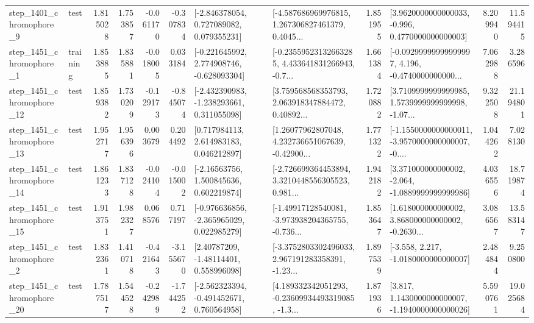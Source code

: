 \begin{tabular}{llrrrrllrlrr}
  step\_1401\_chromophore\_9 &      test &      1.815028 &    1.753857 &     -0.061170 & -0.307834 &    [-2.846378054, 0.727089082, 0.079355231] &  [-4.587686969976815, 1.267306827461379, 0.4045... &       1.851955 &   [3.9620000000000033, -0.996, 0.4770000000000003] &            8.209940 &         11.594415 \\
  step\_1451\_chromophore\_1 &  training &      1.853885 &    1.835881 &     -0.018005 &  0.033184 &   [-0.221645992, 2.774908746, -0.628093304] &  [-0.23559523132663285, 4.433641831266943, -0.7... &       1.661384 &  [-0.09299999999999997, 4.196, -0.4740000000000... &            7.062988 &          3.286596 \\
 step\_1451\_chromophore\_12 &      test &      1.859382 &    1.730209 &     -0.129173 & -0.845074 &   [-2.432390983, -1.238293661, 0.311055098] &  [3.759568568353793, 2.063918347884472, 0.40892... &       1.720882 &  [3.7109999999999985, 1.5739999999999998, -1.07... &            9.322508 &         21.194801 \\
 step\_1451\_chromophore\_13 &      test &      1.952717 &    1.956396 &      0.003679 &  0.204492 &     [0.717984113, 2.614983183, 0.046212897] &  [1.26077962807048, 4.232736651067639, -0.42900... &       1.771322 &  [-1.1550000000000011, -3.9570000000000007, -0.... &            1.044262 &          7.028130 \\
 step\_1451\_chromophore\_14 &      test &      1.861233 &    1.837128 &     -0.024104 & -0.015002 &     [-2.16563756, 1.500845636, 0.602219874] &  [-2.726699364453894, 3.3210448556305523, 0.981... &       1.942182 &   [3.371000000000002, -2.064, -1.0889999999999986] &            4.036556 &         18.719874 \\
 step\_1451\_chromophore\_15 &      test &      1.913751 &    1.982327 &      0.068576 &  0.717197 &   [-0.976636856, -2.365965029, 0.022985279] &  [-1.49917128540081, -3.973938204365755, -0.736... &       1.853647 &  [1.618000000000002, 3.868000000000002, -0.2630... &            3.086567 &         13.583147 \\
  step\_1451\_chromophore\_2 &      test &      1.832361 &    1.410718 &     -0.421643 & -3.155670 &      [2.40787209, -1.48114401, 0.558996098] &  [-3.3752803302496033, 2.967191283358391, -1.23... &       1.897539 &               [-3.558, 2.217, -1.0180000000000007] &            2.484844 &          9.250800 \\
 step\_1451\_chromophore\_20 &      test &      1.787517 &    1.544528 &     -0.242989 & -1.744252 &   [-2.562323394, -0.491452671, 0.760564958] &  [4.189332342051293, -0.23609934493319085, -1.3... &       1.871936 &   [3.817, 1.1430000000000007, -1.1940000000000026] &            5.590761 &         19.025684 \\

\end{tabular}
